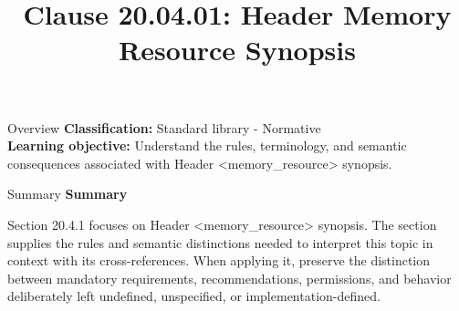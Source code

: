 \documentclass[10pt,letterpaper]{article}
\title{Clause 20.04.01: Header Memory Resource Synopsis}
\author{}
\date{}
\begin{document}
\maketitle
\begin{CornellOverviewBox}{Overview}
\textbf{Classification:} Standard library - Normative\\[2pt]
\textbf{Learning objective:} Understand the rules, terminology, and semantic consequences associated with Header <memory\_resource> synopsis.
\end{CornellOverviewBox}\begin{CornellSummaryBox}{Summary}
{\sffamily\bfseries\color{Accent} Summary}\par\vspace{3pt}Section 20.4.1 focuses on Header <memory\_resource> synopsis. The section supplies the rules and semantic distinctions needed to interpret this topic in context with its cross-references. When applying it, preserve the distinction between mandatory requirements, recommendations, permissions, and behavior deliberately left undefined, unspecified, or implementation-defined.
\end{CornellSummaryBox}
\end{document}
